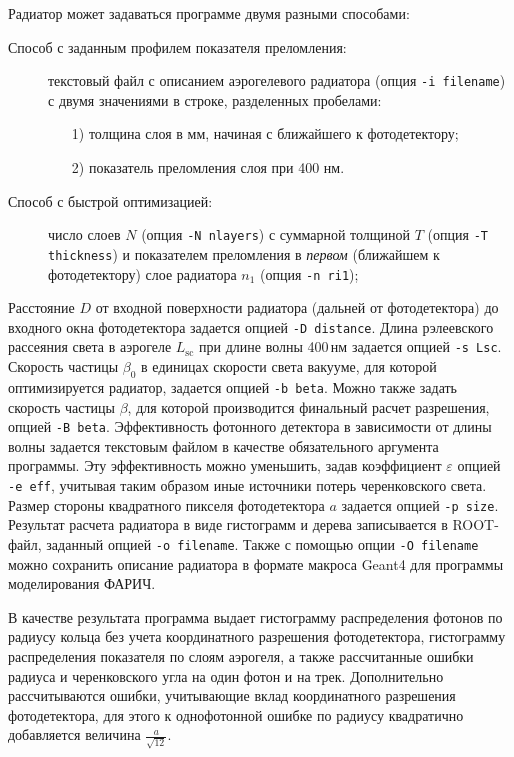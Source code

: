 \documentclass[12pt]{article}
\newcommand{\lsc}{\ensuremath{L_\mathrm{sc}}\xspace}
\newcommand{\betaop}{\ensuremath{\beta_\mathrm{0}}\xspace}
\begin{document}
Радиатор может задаваться программе двумя разными способами:
\begin{description}
 \item[Способ с заданным профилем показателя преломления:] текстовый файл с описанием аэрогелевого радиатора 
      (опция {\tt -i filename}) с двумя значениями в строке, разделенных пробелами: 
      \begin{enumerate}
        \item[1)] толщина слоя в мм, начиная с ближайшего к фотодетектору;
        \item[2)] показатель преломления слоя при 400 нм.
      \end{enumerate}
 \item[Способ с быстрой оптимизацией:] число слоев $N$ (опция {\tt -N nlayers}) с суммарной толщиной $T$ (опция {\tt -T thickness}) и показателем преломления 
      в {\em первом} (ближайшем к фотодетектору) слое радиатора $n_1$ (опция {\tt -n ri1});
\end{description}
Расстояние $D$ от входной поверхности радиатора (дальней от фотодетектора) до входного окна фотодетектора задается опцией {\tt -D distance}.
Длина рэлеевского рассеяния света в аэрогеле \lsc при длине волны 400\,нм задается опцией {\tt -s Lsc}. 
Скорость частицы \betaop в единицах скорости света вакууме, для которой оптимизируется радиатор, задается опцией {\tt -b beta}. 
Можно также задать скорость частицы $\beta$, для которой производится финальный расчет разрешения, опцией {\tt -B beta}.
Эффективность фотонного детектора в зависимости от длины волны задается текстовым файлом в качестве обязательного аргумента программы. 
Эту эффективность можно уменьшить, задав коэффициент $\varepsilon$ опцией {\tt -e eff}, учитывая таким образом иные источники потерь черенковского света. 
Размер стороны квадратного пикселя фотодетектора $a$ задается опцией {\tt -p size}. Результат расчета радиатора в виде гистограмм и дерева записывается 
в ROOT-файл, заданный опцией {\tt -o filename}. Также с помощью опции {\tt -O filename} можно сохранить описание радиатора в формате макроса Geant4  для программы моделирования ФАРИЧ.

В качестве результата программа выдает гистограмму распределения фотонов по радиусу кольца без учета координатного разрешения фотодетектора, гистограмму распределения показателя по слоям аэрогеля, а также рассчитанные ошибки радиуса и черенковского угла на один фотон и на трек. 
Дополнительно рассчитываются ошибки, учитывающие вклад координатного разрешения 
фотодетектора, для этого к однофотонной ошибке по радиусу квадратично добавляется величина $\frac{a}{\sqrt{12}}$.
\end{document}
